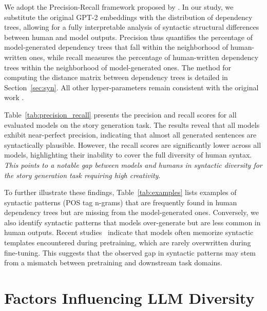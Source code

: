 \documentclass[11pt,a4paper]{article}
\begin{document}
We adopt the Precision-Recall framework proposed by \citet{le-bronnec-etal-2024-exploring}. 
In our study, we substitute the original GPT-2 embeddings with the distribution of dependency trees, allowing for a fully interpretable analysis of syntactic structural differences between human and model outputs. 
Precision thus quantifies the percentage of model-generated dependency trees that fall within the neighborhood of human-written ones, while recall measures the percentage of human-written dependency trees within the neighborhood of model-generated ones.
The method for computing the distance matrix between dependency trees is detailed in Section~\ref{sec:syn}. All other hyper-parameters remain consistent with the original work \citep{le-bronnec-etal-2024-exploring}. 

Table~\ref{tab:precision_recall} presents the precision and recall scores for all evaluated models on the story generation task. The results reveal that all models exhibit near-perfect precision, indicating that almost all generated sentences are syntactically plausible. However, the recall scores are significantly lower across all models, highlighting their inability to cover the full diversity of human syntax. \textit{This points to a notable gap between models and humans in syntactic diversity for the story generation task requiring high creativity}.

To further illustrate these findings, Table~\ref{tab:examples} lists examples of syntactic patterns (POS tag n-grams) that are frequently found in human dependency trees but are missing from the model-generated ones. Conversely, we also identify syntactic patterns that models over-generate but are less common in human outputs. Recent studies~\citep{shaib-etal-2024-detection} indicate that models often memorize syntactic templates encountered during pretraining, which are rarely overwritten during fine-tuning. This suggests that the observed gap in syntactic patterns may stem from a mismatch between pretraining and downstream task domains.




\section{Factors Influencing LLM Diversity}
\end{document}
